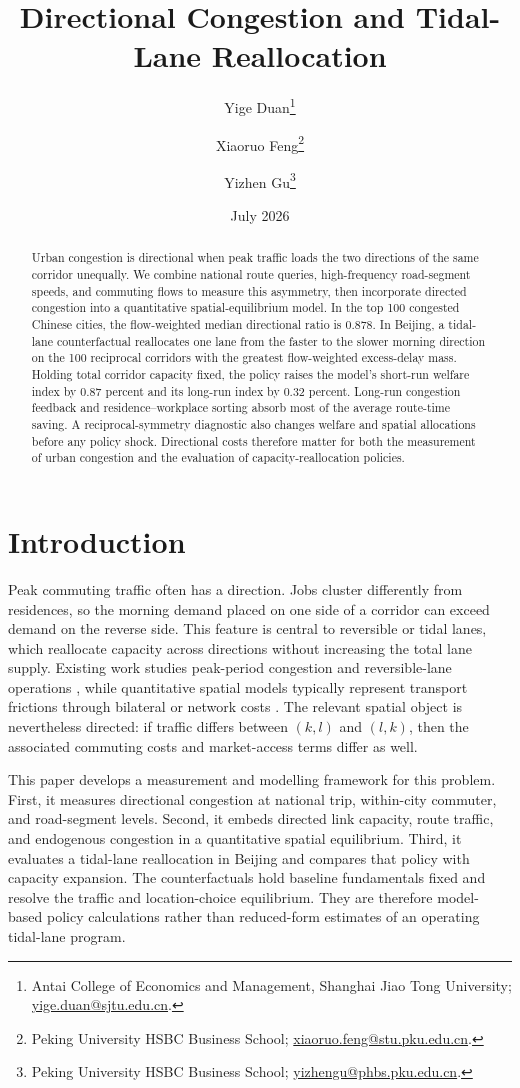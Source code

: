 \documentclass[12pt]{article}
\title{Directional Congestion and Tidal-Lane Reallocation}
\author{
Yige Duan\thanks{Antai College of Economics and Management, Shanghai Jiao Tong University; \href{mailto:yige.duan@sjtu.edu.cn}{yige.duan@sjtu.edu.cn}.}
\and
Xiaoruo Feng\thanks{Peking University HSBC Business School; \href{mailto:xiaoruo.feng@stu.pku.edu.cn}{xiaoruo.feng@stu.pku.edu.cn}.}
\and
Yizhen Gu\thanks{Peking University HSBC Business School; \href{mailto:yizhengu@phbs.pku.edu.cn}{yizhengu@phbs.pku.edu.cn}.}
}
\date{July 2026}
\begin{document}
\maketitle

\begin{abstract}
Urban congestion is directional when peak traffic loads the two directions of the same corridor unequally. We combine national route queries, high-frequency road-segment speeds, and commuting flows to measure this asymmetry, then incorporate directed congestion into a quantitative spatial-equilibrium model. In the top 100 congested Chinese cities, the flow-weighted median directional ratio is 0.878. In Beijing, a tidal-lane counterfactual reallocates one lane from the faster to the slower morning direction on the 100 reciprocal corridors with the greatest flow-weighted excess-delay mass. Holding total corridor capacity fixed, the policy raises the model's short-run welfare index by 0.87 percent and its long-run index by 0.32 percent. Long-run congestion feedback and residence--workplace sorting absorb most of the average route-time saving. A reciprocal-symmetry diagnostic also changes welfare and spatial allocations before any policy shock. Directional costs therefore matter for both the measurement of urban congestion and the evaluation of capacity-reallocation policies.
\end{abstract}

\section{Introduction}

Peak commuting traffic often has a direction. Jobs cluster differently from residences, so the morning demand placed on one side of a corridor can exceed demand on the reverse side. This feature is central to reversible or tidal lanes, which reallocate capacity across directions without increasing the total lane supply. Existing work studies peak-period congestion and reversible-lane operations \citep{vickrey1969,arnott1993,wolshon2006}, while quantitative spatial models typically represent transport frictions through bilateral or network costs \citep{ahlfeldt2015,allenarkolakis2022}. The relevant spatial object is nevertheless directed: if traffic differs between $(k,l)$ and $(l,k)$, then the associated commuting costs and market-access terms differ as well.

This paper develops a measurement and modelling framework for this problem. First, it measures directional congestion at national trip, within-city commuter, and road-segment levels. Second, it embeds directed link capacity, route traffic, and endogenous congestion in a quantitative spatial equilibrium. Third, it evaluates a tidal-lane reallocation in Beijing and compares that policy with capacity expansion. The counterfactuals hold baseline fundamentals fixed and resolve the traffic and location-choice equilibrium. They are therefore model-based policy calculations rather than reduced-form estimates of an operating tidal-lane program.
\end{document}
